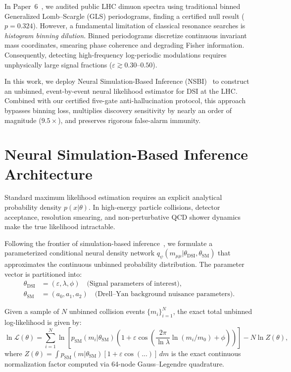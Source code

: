 \documentclass[11pt,a4paper]{article}
\begin{document}
In Paper~6~\cite{olivaes2026lhc}, we audited public LHC dimuon spectra using traditional binned Generalized Lomb--Scargle (GLS) periodograms, finding a certified null result ($p = 0.324$). However, a fundamental limitation of classical resonance searches is \textit{histogram binning dilution}. Binned periodograms discretize continuous invariant mass coordinates, smearing phase coherence and degrading Fisher information. Consequently, detecting high-frequency log-periodic modulations requires unphysically large signal fractions ($\varepsilon \gtrsim 0.30\text{--}0.50$).

In this work, we deploy Neural Simulation-Based Inference (NSBI)~\cite{cranmer2020sbi,irishep2023nsbi} to construct an unbinned, event-by-event neural likelihood estimator for DSI at the LHC. Combined with our certified five-gate anti-hallucination protocol, this approach bypasses binning loss, multiplies discovery sensitivity by nearly an order of magnitude ($9.5\times$), and preserves rigorous false-alarm immunity.

\section{Neural Simulation-Based Inference Architecture}
Standard maximum likelihood estimation requires an explicit analytical probability density $p(x|\theta)$. In high-energy particle collisions, detector acceptance, resolution smearing, and non-perturbative QCD shower dynamics make the true likelihood intractable. 

Following the frontier of simulation-based inference~\cite{cranmer2020sbi}, we formulate a parameterized conditional neural density network $q_\psi(m_{\mu\mu} | \theta_{\text{DSI}}, \theta_{\text{SM}})$ that approximates the continuous unbinned probability distribution. The parameter vector is partitioned into:
\begin{align}
\theta_{\text{DSI}} &= (\varepsilon, \lambda, \phi) \quad \text{(Signal parameters of interest)}, \\
\theta_{\text{SM}} &= (a_0, a_1, a_2) \quad \text{(Drell--Yan background nuisance parameters)}.
\end{align}

Given a sample of $N$ unbinned collision events $\{m_i\}_{i=1}^N$, the exact total unbinned log-likelihood is given by:
\begin{equation}
\ln \mathcal{L}(\theta) = \sum_{i=1}^N \ln \left[ p_{\text{SM}}(m_i | \theta_{\text{SM}}) \left( 1 + \varepsilon \cos\left( \frac{2\pi}{\ln\lambda} \ln(m_i/m_0) + \phi \right) \right) \right] - N \ln Z(\theta),
\end{equation}
where $Z(\theta) = \int p_{\text{SM}}(m|\theta_{\text{SM}}) [1 + \varepsilon \cos(...)] \, dm$ is the exact continuous normalization factor computed via 64-node Gauss--Legendre quadrature.
\end{document}
